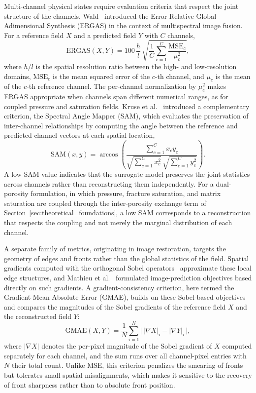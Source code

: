 Multi-channel physical states require evaluation criteria that respect the joint structure of the channels. Wald~\cite{wald2002data} introduced the Error Relative Global Adimensional Synthesis (ERGAS) in the context of multispectral image fusion. For a reference field $X$ and a predicted field $Y$ with $C$ channels,
\begin{equation}
    \text{ERGAS}(X, Y) = 100 \, \frac{h}{l} \, \sqrt{\frac{1}{C} \sum_{c=1}^{C} \frac{\text{MSE}_c}{\mu_c^2}},
    \label{eq:ergas}
\end{equation}
where $h/l$ is the spatial resolution ratio between the high- and low-resolution domains, $\text{MSE}_c$ is the mean squared error of the $c$-th channel, and $\mu_c$ is the mean of the $c$-th reference channel. The per-channel normalization by $\mu_c^2$ makes ERGAS appropriate when channels span different numerical ranges, as for coupled pressure and saturation fields. Kruse et al.~\cite{kruse1993spectral} introduced a complementary criterion, the Spectral Angle Mapper (SAM), which evaluates the preservation of inter-channel relationships by computing the angle between the reference and predicted channel vectors at each spatial location,
\begin{equation}
    \text{SAM}(x, y) = \arccos\!\left( \frac{\sum_{c=1}^{C} x_c y_c}{\sqrt{\sum_{c=1}^{C} x_c^2} \, \sqrt{\sum_{c=1}^{C} y_c^2}} \right).
    \label{eq:sam}
\end{equation}
A low SAM value indicates that the surrogate model preserves the joint statistics across channels rather than reconstructing them independently. For a dual-porosity formulation, in which pressure, fracture saturation, and matrix saturation are coupled through the inter-porosity exchange term of Section~\ref{sec:theoretical_foundations}, a low SAM corresponds to a reconstruction that respects the coupling and not merely the marginal distribution of each channel.

A separate family of metrics, originating in image restoration, targets the geometry of edges and fronts rather than the global statistics of the field. Spatial gradients computed with the orthogonal Sobel operators~\cite{sobel1968isotropic} approximate these local edge structures, and Mathieu et al.~\cite{mathieu2016deep} formulated image-prediction objectives based directly on such gradients. A gradient-consistency criterion, here termed the Gradient Mean Absolute Error (GMAE), builds on these Sobel-based objectives and compares the magnitudes of the Sobel gradients of the reference field $X$ and the reconstructed field $Y$:
\begin{equation}
    \text{GMAE}(X, Y) = \frac{1}{N} \sum_{i=1}^{N} \bigl| \, |\nabla X|_i - |\nabla Y|_i \, \bigr|,
    \label{eq:gmae}
\end{equation}
where $|\nabla X|$ denotes the per-pixel magnitude of the Sobel gradient of $X$ computed separately for each channel, and the sum runs over all channel-pixel entries with $N$ their total count. Unlike MSE, this criterion penalizes the smearing of fronts but tolerates small spatial misalignments, which makes it sensitive to the recovery of front sharpness rather than to absolute front position.


